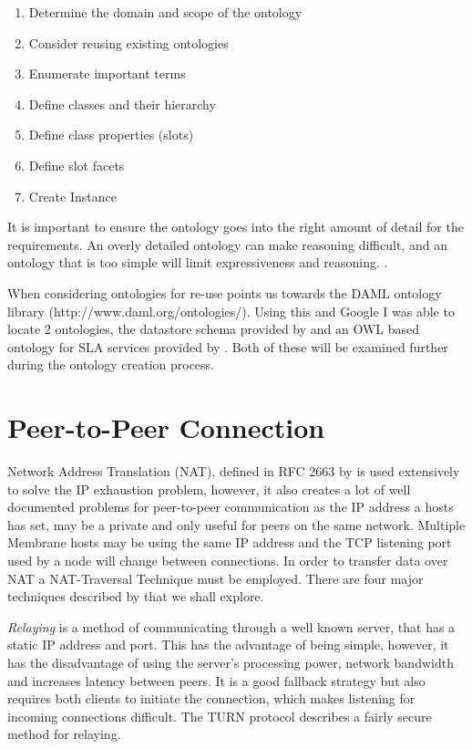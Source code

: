 \documentclass[11pt, a4paper, twocolumn, twoside]{report}
\begin{document}
\begin{enumerate}
 \item Determine the domain and scope of the ontology
 \item Consider reusing existing ontologies
 \item Enumerate important terms
 \item Define classes and their hierarchy
 \item Define class properties (slots)
 \item Define slot facets
 \item Create Instance
\end{enumerate}

It is important to ensure the ontology goes into the right amount of detail for the requirements. An overly detailed ontology can make reasoning difficult, and an ontology that is too simple will limit expressiveness and reasoning. \citep*{wooldridge2009introduction, sugumaran2002ontologies}.

When considering ontologies for re-use \cite{noy2001ontology} points us towards the DAML ontology library (http://www.daml.org/ontologies/). Using this and Google I was able to locate 2 ontologies, the datastore schema provided by \cite{w32001datastore} and an OWL based ontology for SLA services provided by \cite{pande2012slaont}. Both of these will be examined further during the ontology creation process.

\section{Peer-to-Peer Connection} \label{sec:p2pconn}

Network Address Translation (NAT), defined in RFC 2663 by \cite{srisuresh1999ip} is used extensively to solve the IP exhaustion problem, however, it also creates a lot of well documented problems for peer-to-peer communication as the IP address a hosts has set, may be a private and only useful for peers on the same network. Multiple Membrane hosts may be using the same IP address and the TCP listening port used by a node will change between connections. In order to transfer data over NAT a NAT-Traversal Technique must be employed. There are four major techniques described by \cite{ford2005peer} that we shall explore.

\emph{Relaying} is a method of communicating through a well known server, that has a static IP address and port. This has the advantage of being simple, however, it has the disadvantage of using the server's processing power, network bandwidth and increases latency between peers. It is a good fallback strategy but also requires both clients to initiate the connection, which makes listening for incoming connections difficult. The TURN protocol \citep{rosenberg2005traversal} describes a fairly secure method for relaying.
\end{document}
